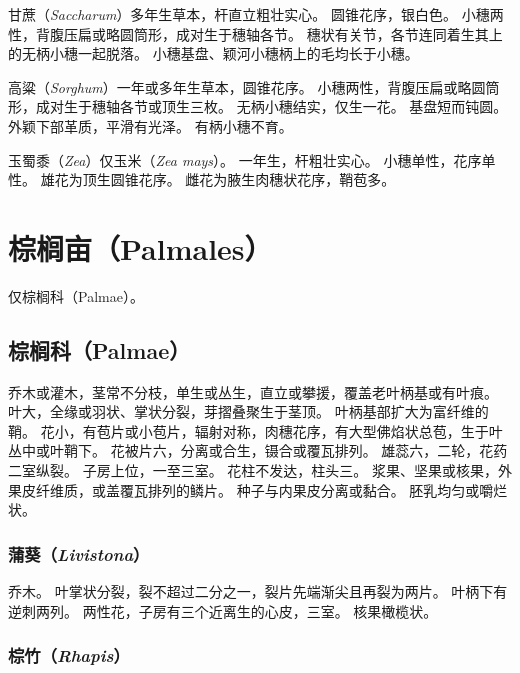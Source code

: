 \documentclass[11pt]{article}
\begin{document}
\begin{sloppypar}
\par

甘蔗（\textit{Saccharum}）多年生草本，杆直立粗壮实心。
圆锥花序，银白色。
小穗两性，背腹压扁或略圆筒形，成对生于穗轴各节。
穗状有关节，各节连同着生其上的无柄小穗一起脱落。
小穗基盘、颖河小穗柄上的毛均长于小穗。

\par

高粱（\textit{Sorghum}）一年或多年生草本，圆锥花序。
小穗两性，背腹压扁或略圆筒形，成对生于穗轴各节或顶生三枚。
无柄小穗结实，仅生一花。
基盘短而钝圆。
外颖下部革质，平滑有光泽。
有柄小穗不育。

\par

玉蜀黍（\textit{Zea}）仅玉米（\textit{Zea mays}）。
一年生，杆粗壮实心。
小穗单性，花序单性。
雄花为顶生圆锥花序。
雌花为腋生肉穗状花序，鞘苞多。

\section{棕榈亩（Palmales）}
仅棕榈科（Palmae）。

\subsection{棕榈科（Palmae）}
乔木或灌木，茎常不分枝，单生或丛生，直立或攀援，覆盖老叶柄基或有叶痕。
叶大，全缘或羽状、掌状分裂，芽摺叠聚生于茎顶。
叶柄基部扩大为富纤维的鞘。
花小，有苞片或小苞片，辐射对称，肉穗花序，有大型佛焰状总苞，生于叶丛中或叶鞘下。
花被片六，分离或合生，镊合或覆瓦排列。
雄蕊六，二轮，花药二室纵裂。
子房上位，一至三室。
花柱不发达，柱头三。
浆果、坚果或核果，外果皮纤维质，或盖覆瓦排列的鳞片。
种子与内果皮分离或黏合。
胚乳均匀或嚼烂状。

\subsubsection{蒲葵（\textit{Livistona}）}
乔木。
叶掌状分裂，裂不超过二分之一，裂片先端渐尖且再裂为两片。
叶柄下有逆刺两列。
两性花，子房有三个近离生的心皮，三室。
核果橄榄状。

\subsubsection{棕竹（\textit{Rhapis}）}

\end{sloppypar}
\end{document}
